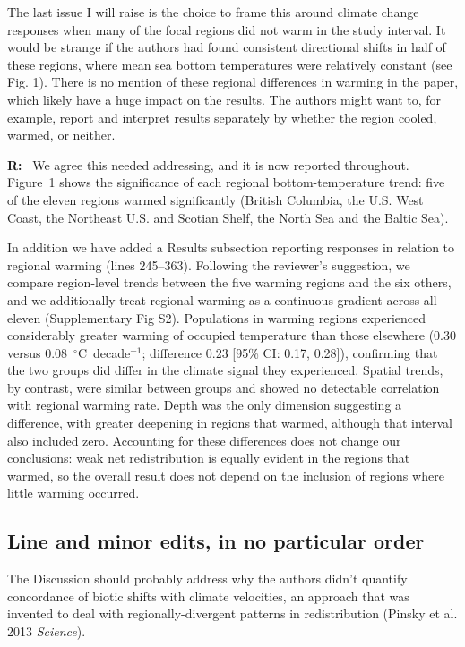 \documentclass[11pt]{article}
\newcommand{\reviewer}[1]{\par\medskip\noindent\textcolor{revcolor}{#1}\par}
\newenvironment{reply}
{\par\smallskip\begingroup\color{replycolor}\noindent\textbf{R:}\ }
{\endgroup\par\medskip}
\begin{document}
\reviewer{The last issue I will raise is the choice to frame this around climate change responses when many of the focal regions did not warm in the study interval. It would be strange if the authors had found consistent directional shifts in half of these regions, where mean sea bottom temperatures were relatively constant (see
Fig. 1). There is no mention of these regional differences in warming in the paper, which likely have a huge impact on the results. The authors might want to, for example, report and interpret results separately by whether the region cooled, warmed, or neither.}

\begin{reply}
We agree this needed addressing, and it is now reported throughout. Figure~1 shows the significance of each regional bottom-temperature trend: five of the eleven regions warmed significantly (British Columbia, the U.S. West Coast, the Northeast U.S. and Scotian Shelf, the North Sea and the Baltic Sea).

In addition we have added a Results subsection reporting responses in relation to regional warming (lines 245--363). Following the reviewer's suggestion, we compare region-level trends between the five warming regions and the six others, and we additionally treat regional warming as a continuous gradient across all eleven (Supplementary Fig S2). Populations in warming regions experienced considerably greater warming of occupied temperature than those elsewhere (0.30 versus 0.08~$^{\circ}$C~decade$^{-1}$; difference 0.23 [95\% CI: 0.17, 0.28]), confirming that the two groups did differ in the climate signal they experienced. Spatial trends, by contrast, were similar between groups and showed no detectable correlation with regional warming rate. Depth was the only dimension suggesting a difference, with greater deepening in regions that warmed, although that interval also included zero. 
Accounting for these differences does not change our conclusions: weak net redistribution is equally evident in the regions that warmed, so the overall result does not depend on the inclusion of regions where little warming occurred.
\end{reply}

\subsection*{Line and minor edits, in no particular order}

\reviewer{The Discussion should probably address why the authors didn't quantify concordance of biotic shifts with climate velocities, an approach that was invented to deal with regionally-divergent patterns in redistribution (Pinsky et al. 2013
\textit{Science}).}
\end{document}
